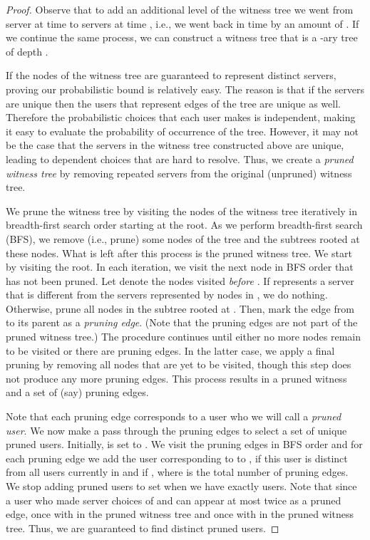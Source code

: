 \documentclass[conference]{IEEEtran}
\begin{document}
\begin{proof}
Observe that to add an additional level of the witness tree we went from server  at time  to servers  at time , i.e., we went back in time by an amount of . If we continue the same process, we can construct a witness tree that is a -ary tree of depth . 


If the nodes of the witness tree are guaranteed to represent distinct servers, proving our probabilistic bound is relatively easy. The reason is that if the servers are unique then the users that represent edges of the tree are unique as well. Therefore the probabilistic choices that each user makes is independent, making it easy to evaluate the probability of occurrence of the tree. However, it may not be the case that the servers in the witness tree constructed above are unique, leading to dependent choices that are hard to resolve. Thus, we create a {\em pruned witness tree} by removing repeated servers from the  original (unpruned) witness tree. 

We prune the witness tree by visiting the nodes of the witness tree iteratively in breadth-first  search order starting at the root. As we perform breadth-first search (BFS), we remove (i.e., prune) some nodes of the tree and the subtrees rooted  at these nodes. What is left after this process is the pruned witness tree. We start by visiting the root. In each iteration, we visit the next  node  in BFS order that has not been pruned. Let  denote the nodes visited {\it before\/} . If  represents a server that is different from the servers represented by nodes in , we do nothing.
 Otherwise, prune all nodes in the subtree rooted at . Then, mark the edge from  to its parent  as a {\em pruning edge}. (Note that the pruning edges are not part of the pruned witness tree.) The procedure continues until either no more nodes remain to be visited or there are  pruning edges. In the latter case, we apply a final pruning by removing all nodes that are yet to be visited, though this step does not produce any more pruning edges. This process results in a pruned witness and a set of  (say) pruning edges.  

 Note that each pruning edge corresponds to a user who we will call a {\em pruned user}. We now make a pass through the pruning edges to select a set  of unique pruned users. Initially,  is set to . We visit the pruning edges in BFS order and for each pruning edge  we add the user corresponding to  to , if this user is distinct from all users currently in  and if , where  is the total number of pruning edges. We stop adding pruned users to set  when we have exactly   users. Note that since a user who made server choices of  and  can appear at most twice as a pruned edge, once with  in the pruned witness tree and once with  in the pruned witness tree. Thus, we are guaranteed to find  distinct pruned users. 
 

\end{proof}
\end{document}
